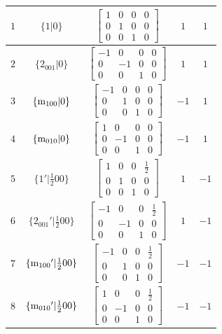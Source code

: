 \documentclass[fleqn,8pt]{jsarticle}
\begin{document}
\begin{longtable}{ccccc}
$ 1 $ & $ \{1|0\} $ & $ \begin{bmatrix} 1 & 0 & 0 & 0 \\ 0 & 1 & 0 & 0 \\ 0 & 0 & 1 & 0 \end{bmatrix} $ & $ 1 $ & $ 1 $ \\ \hline
$ 2 $ & $ \{2{}_{001}|0\} $ & $ \begin{bmatrix} -1 & 0 & 0 & 0 \\ 0 & -1 & 0 & 0 \\ 0 & 0 & 1 & 0 \end{bmatrix} $ & $ 1 $ & $ 1 $ \\ \hline
$ 3 $ & $ \{{\rm m}_{100}|0\} $ & $ \begin{bmatrix} -1 & 0 & 0 & 0 \\ 0 & 1 & 0 & 0 \\ 0 & 0 & 1 & 0 \end{bmatrix} $ & $ -1 $ & $ 1 $ \\ \hline
$ 4 $ & $ \{{\rm m}_{010}|0\} $ & $ \begin{bmatrix} 1 & 0 & 0 & 0 \\ 0 & -1 & 0 & 0 \\ 0 & 0 & 1 & 0 \end{bmatrix} $ & $ -1 $ & $ 1 $ \\ \hline
$ 5 $ & $ \{1{}'|\frac{1}{2} 0 0\} $ & $ \begin{bmatrix} 1 & 0 & 0 & \frac{1}{2} \\ 0 & 1 & 0 & 0 \\ 0 & 0 & 1 & 0 \end{bmatrix} $ & $ 1 $ & $ -1 $ \\ \hline
$ 6 $ & $ \{2{}_{001}{}'|\frac{1}{2} 0 0\} $ & $ \begin{bmatrix} -1 & 0 & 0 & \frac{1}{2} \\ 0 & -1 & 0 & 0 \\ 0 & 0 & 1 & 0 \end{bmatrix} $ & $ 1 $ & $ -1 $ \\ \hline
$ 7 $ & $ \{{\rm m}_{100}{}'|\frac{1}{2} 0 0\} $ & $ \begin{bmatrix} -1 & 0 & 0 & \frac{1}{2} \\ 0 & 1 & 0 & 0 \\ 0 & 0 & 1 & 0 \end{bmatrix} $ & $ -1 $ & $ -1 $ \\ \hline
$ 8 $ & $ \{{\rm m}_{010}{}'|\frac{1}{2} 0 0\} $ & $ \begin{bmatrix} 1 & 0 & 0 & \frac{1}{2} \\ 0 & -1 & 0 & 0 \\ 0 & 0 & 1 & 0 \end{bmatrix} $ & $ -1 $ & $ -1 $ \\
\end{longtable}
\end{document}
